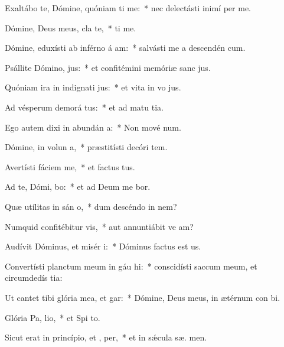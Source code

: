 \item Exaltábo te, Dómine, quóniam ti me:~* nec delectásti inimí  per me.
\item Dómine, Deus meus, cla  te,~*  ti me.
\item Dómine, eduxísti ab inférno á am:~* salvásti me a descendén  cum.
\item Psállite Dómino,  jus:~* et confitémini memóriæ sanc jus.
\item Quóniam ira in indignati jus:~* et vita in vo jus.
\item Ad vésperum demorá tus:~* et ad matu tia.
\item Ego autem dixi in abundán a:~* Non mové  num.
\item Dómine, in volun a,~* præstitísti decóri  tem.
\item Avertísti fáciem   me,~* et factus  tus.
\item Ad te, Dómi, bo:~* et ad Deum me bor.
\item Quæ utílitas in sán o,~* dum descéndo in nem?
\item Numquid confitébitur  vis,~* aut annuntiábit ve am?
\item Audívit Dóminus, et misér  i:~* Dóminus factus est  us.
\item Convertísti planctum meum in gáu hi:~* conscidísti saccum meum, et circumdedís  tia:
\item Ut cantet tibi glória mea, et  gar:~* Dómine, Deus meus, in ætérnum con bi.
\item Glória Pa,  lio,~* et Spi to.
\item Sicut erat in princípio, et ,  per,~* et in sǽcula sæ. men.

